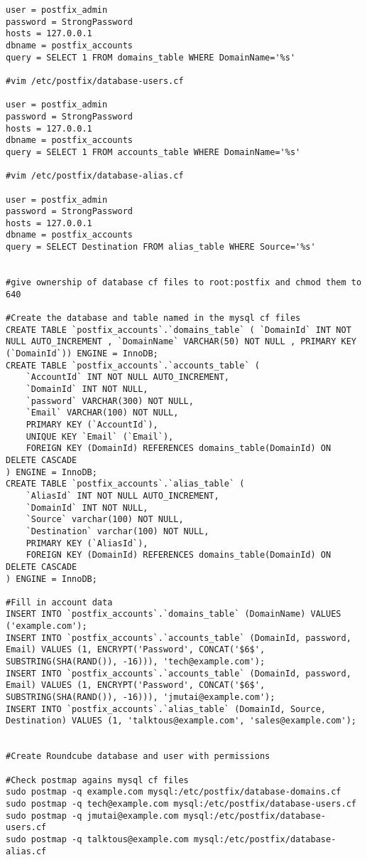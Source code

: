 \documentclass{article}
\begin{document}
\begin{verbatim}
user = postfix_admin
password = StrongPassword
hosts = 127.0.0.1
dbname = postfix_accounts
query = SELECT 1 FROM domains_table WHERE DomainName='%s'

#vim /etc/postfix/database-users.cf

user = postfix_admin
password = StrongPassword
hosts = 127.0.0.1
dbname = postfix_accounts
query = SELECT 1 FROM accounts_table WHERE DomainName='%s'

#vim /etc/postfix/database-alias.cf

user = postfix_admin
password = StrongPassword
hosts = 127.0.0.1
dbname = postfix_accounts
query = SELECT Destination FROM alias_table WHERE Source='%s'


#give ownership of database cf files to root:postfix and chmod them to 640

#Create the database and table named in the mysql cf files
CREATE TABLE `postfix_accounts`.`domains_table` ( `DomainId` INT NOT NULL AUTO_INCREMENT , `DomainName` VARCHAR(50) NOT NULL , PRIMARY KEY (`DomainId`)) ENGINE = InnoDB;
CREATE TABLE `postfix_accounts`.`accounts_table` ( 
    `AccountId` INT NOT NULL AUTO_INCREMENT,  
    `DomainId` INT NOT NULL,  
    `password` VARCHAR(300) NOT NULL,  
    `Email` VARCHAR(100) NOT NULL,  
    PRIMARY KEY (`AccountId`),  
    UNIQUE KEY `Email` (`Email`),  
    FOREIGN KEY (DomainId) REFERENCES domains_table(DomainId) ON DELETE CASCADE 
) ENGINE = InnoDB;
CREATE TABLE `postfix_accounts`.`alias_table` (
    `AliasId` INT NOT NULL AUTO_INCREMENT, 
    `DomainId` INT NOT NULL, 
    `Source` varchar(100) NOT NULL, 
    `Destination` varchar(100) NOT NULL, 
    PRIMARY KEY (`AliasId`), 
    FOREIGN KEY (DomainId) REFERENCES domains_table(DomainId) ON DELETE CASCADE
) ENGINE = InnoDB;

#Fill in account data
INSERT INTO `postfix_accounts`.`domains_table` (DomainName) VALUES ('example.com');  
INSERT INTO `postfix_accounts`.`accounts_table` (DomainId, password, Email) VALUES (1, ENCRYPT('Password', CONCAT('$6$', SUBSTRING(SHA(RAND()), -16))), 'tech@example.com');  
INSERT INTO `postfix_accounts`.`accounts_table` (DomainId, password, Email) VALUES (1, ENCRYPT('Password', CONCAT('$6$', SUBSTRING(SHA(RAND()), -16))), 'jmutai@example.com');  
INSERT INTO `postfix_accounts`.`alias_table` (DomainId, Source, Destination) VALUES (1, 'talktous@example.com', 'sales@example.com');


#Create Roundcube database and user with permissions 

#Check postmap agains mysql cf files 
sudo postmap -q example.com mysql:/etc/postfix/database-domains.cf
sudo postmap -q tech@example.com mysql:/etc/postfix/database-users.cf
sudo postmap -q jmutai@example.com mysql:/etc/postfix/database-users.cf
sudo postmap -q talktous@example.com mysql:/etc/postfix/database-alias.cf

\end{verbatim}
\end{document}

